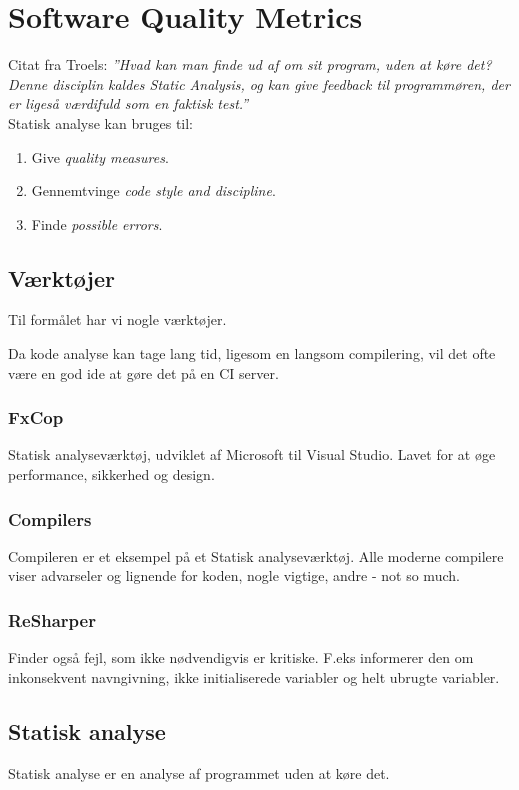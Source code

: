 \section{Software Quality Metrics}
Citat fra Troels: \textit{''Hvad kan man finde ud af om sit program, uden at køre det? Denne disciplin kaldes Static Analysis, og kan give feedback til programmøren, der er ligeså værdifuld som en faktisk test.''}\\

Statisk analyse kan bruges til: 

\begin{enumerate}
	\item Give \textit{quality measures}.
	\item Gennemtvinge \textit{code style and discipline}.
	\item Finde \textit{possible errors}.
\end{enumerate}

\subsection{Værktøjer} 
Til formålet har vi nogle værktøjer. 

Da kode analyse kan tage lang tid, ligesom en langsom compilering, vil det ofte være en god ide at gøre det på en CI server.

\subsubsection{FxCop}
Statisk analyseværktøj, udviklet af Microsoft til Visual Studio. Lavet for at øge performance, sikkerhed og design.

\subsubsection{Compilers}
Compileren er et eksempel på et Statisk analyseværktøj. Alle moderne compilere viser advarseler og lignende for koden, nogle vigtige, andre - not so much.

\subsubsection{ReSharper}
Finder også fejl, som ikke nødvendigvis er kritiske. F.eks informerer den om inkonsekvent navngivning, ikke initialiserede variabler og helt ubrugte variabler.

\subsection{Statisk analyse}
Statisk analyse er en analyse af programmet uden at køre det.
